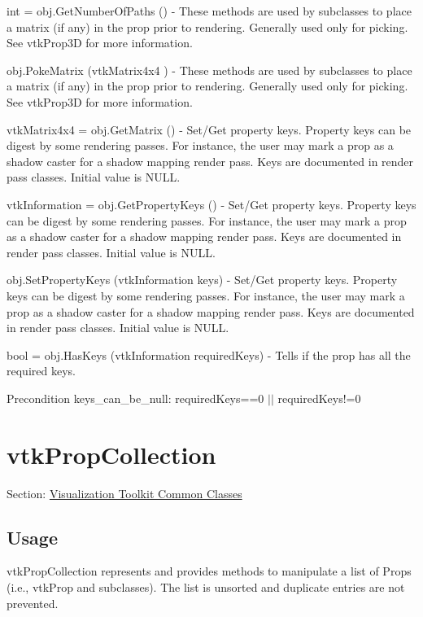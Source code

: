 \begin{DoxyItemize}
\item {\ttfamily int = obj.\-Get\-Number\-Of\-Paths ()} -\/ These methods are used by subclasses to place a matrix (if any) in the prop prior to rendering. Generally used only for picking. See vtk\-Prop3\-D for more information.  
\item {\ttfamily obj.\-Poke\-Matrix (vtk\-Matrix4x4 )} -\/ These methods are used by subclasses to place a matrix (if any) in the prop prior to rendering. Generally used only for picking. See vtk\-Prop3\-D for more information.  
\item {\ttfamily vtk\-Matrix4x4 = obj.\-Get\-Matrix ()} -\/ Set/\-Get property keys. Property keys can be digest by some rendering passes. For instance, the user may mark a prop as a shadow caster for a shadow mapping render pass. Keys are documented in render pass classes. Initial value is N\-U\-L\-L.  
\item {\ttfamily vtk\-Information = obj.\-Get\-Property\-Keys ()} -\/ Set/\-Get property keys. Property keys can be digest by some rendering passes. For instance, the user may mark a prop as a shadow caster for a shadow mapping render pass. Keys are documented in render pass classes. Initial value is N\-U\-L\-L.  
\item {\ttfamily obj.\-Set\-Property\-Keys (vtk\-Information keys)} -\/ Set/\-Get property keys. Property keys can be digest by some rendering passes. For instance, the user may mark a prop as a shadow caster for a shadow mapping render pass. Keys are documented in render pass classes. Initial value is N\-U\-L\-L.  
\item {\ttfamily bool = obj.\-Has\-Keys (vtk\-Information required\-Keys)} -\/ Tells if the prop has all the required keys. \begin{DoxyPrecond}{Precondition}
keys\-\_\-can\-\_\-be\-\_\-null\-: required\-Keys==0 $|$$|$ required\-Keys!=0  
\end{DoxyPrecond}

\end{DoxyItemize}\hypertarget{vtkcommon_vtkpropcollection}{}\section{vtk\-Prop\-Collection}\label{vtkcommon_vtkpropcollection}
Section\-: \hyperlink{sec_vtkcommon}{Visualization Toolkit Common Classes} \hypertarget{vtkwidgets_vtkxyplotwidget_Usage}{}\subsection{Usage}\label{vtkwidgets_vtkxyplotwidget_Usage}
vtk\-Prop\-Collection represents and provides methods to manipulate a list of Props (i.\-e., vtk\-Prop and subclasses). The list is unsorted and duplicate entries are not prevented.

